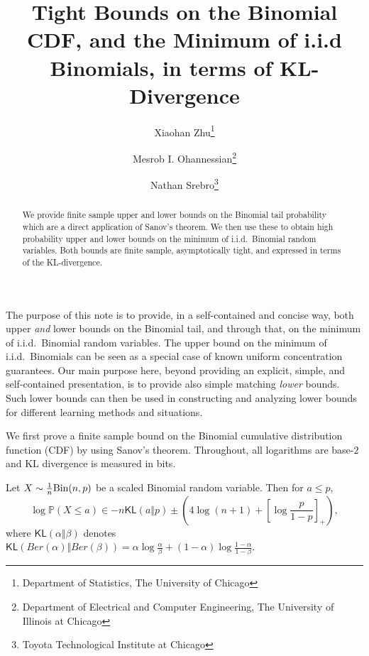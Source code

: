 \documentclass[12pt]{article}
\newcommand{\KL}{\textsf{KL}}
\begin{document}
\title{Tight Bounds on the Binomial CDF, and the Minimum of i.i.d Binomials, in terms of KL-Divergence}

\author{Xiaohan Zhu\thanks{Department of Statistics, The University of Chicago} \and 
Mesrob I. Ohannessian\thanks{Department of Electrical and Computer Engineering, The University of Illinois at Chicago} \and Nathan Srebro\thanks{Toyota Technological Institute at Chicago}}

\date{}
\maketitle


\begin{abstract}
    We provide finite sample upper and lower bounds on the Binomial tail probability which are a direct application of Sanov's theorem. We then use these to obtain high probability upper and lower bounds on the minimum of i.i.d.~Binomial random variables.  Both bounds are finite sample, asymptotically tight, and expressed in terms of the KL-divergence.
\end{abstract}

The purpose of this note is to provide, in a self-contained and concise way, both upper {\em and} lower bounds on the Binomial tail, and through that, on the minimum of i.i.d.~Binomial random variables.  The upper bound on the minimum of i.i.d.~Binomials can be seen as a special case of known uniform concentration guarantees.  Our main purpose here, beyond providing an explicit, simple, and self-contained presentation, is to provide also simple matching {\em lower} bounds.  Such lower bounds can then be used in constructing and analyzing lower bounds for different learning methods and situations. 

We first prove a finite sample bound on the Binomial cumulative distribution function (CDF) by using Sanov's theorem. Throughout, all logarithms are base-$2$ and KL divergence is measured in bits.
\begin{lemma}
\label{lemma}
    Let $X \sim \frac{1}{n}\textnormal{Bin}(n, p)$ be a scaled Binomial random variable. Then for $a \leq p$,
    \[
    \log \mathbb{P}(X \leq a) \in -n \KL(a\Vert p) \pm \left(4\log(n+1) + \left[\log \frac{p}{1-p}\right]_+\right),
    \]   where $\KL(\alpha\Vert \beta)$ denotes $\KL(Ber(\alpha)\Vert Ber(\beta)) = \alpha\log\frac{\alpha}{\beta} + (1-\alpha)\log\frac{1-\alpha}{1-\beta}$.
\end{lemma}
\end{document}
